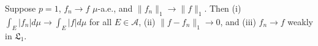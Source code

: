 Suppose $p = 1$, $f_n \to f$ $\mu$-a.e., and $\|f_n\|_1 \to \|f\|_1$. Then (i) $\int_E |f_n| d\mu \to \int_E |f| d\mu$ for all $E \in \mathcal{A}$, (ii) $\|f - f_n\|_1 \to 0$, and (iii) $f_n \to f$ weakly in $\mathfrak{L}_1$.
